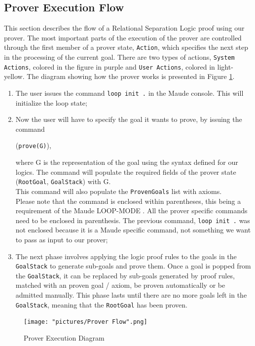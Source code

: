 \documentclass[12pt,a4paper]{article}
\begin{document}
{\subsection{Prover Execution Flow}
This section describes the flow of a Relational Separation Logic proof using our prover. The most important parts of the execution of the prover are controlled through the first member of a prover state, \texttt{Action}, which specifies the next step in the processing of the current goal. There are two types of actions, \texttt{System Actions}, colored in the figure in purple and \texttt{User Actions}, colored in light-yellow. The diagram showing how the prover works is presented in Figure \ref{fig:ProverDiagram}.
\\
\begin{enumerate}
	\item The user issues the command \texttt{loop init .} in the Maude console. This will initialize the loop state;
	\item Now the user will have to specify the goal it wants to prove, by issuing the command \begin{center}(\texttt{prove(G)}),\end{center} where G is the representation of the goal using the syntax defined for our logics. The command will populate the required fields of the prover state (\texttt{RootGoal}, \texttt{GoalStack}) with G.
	\\
	
	This command will also populate the \texttt{ProvenGoals} list with axioms.
	\\
	
	Please note that the command is enclosed within parentheses, this being a requirement of the  Maude LOOP-MODE \cite{manual}. All the prover specific commands need to be enclosed in parenthesis. The previous command, \texttt{loop init .} was not enclosed because it is a Maude specific command, not something we want to pass as input to our prover;
	\item The next phase involves applying the logic proof rules to the goals in the \texttt{GoalStack} to generate sub-goals and prove them. Once a goal is popped from the \texttt{GoalStack}, it can be replaced by sub-goals generated by proof rules, matched with an proven goal / axiom, be proven automatically or be admitted manually. This phase lasts until there are no more goals left in the \texttt{GoalStack}, meaning that the \texttt{RootGoal} has been proven.
\end{enumerate}
\begin{figure}[h!]
	\texttt{[image: "pictures/Prover Flow".png]}
	\caption{Prover Execution Diagram}
	\label{fig:ProverDiagram}
\end{figure} 
\clearpage
}
\end{document}
